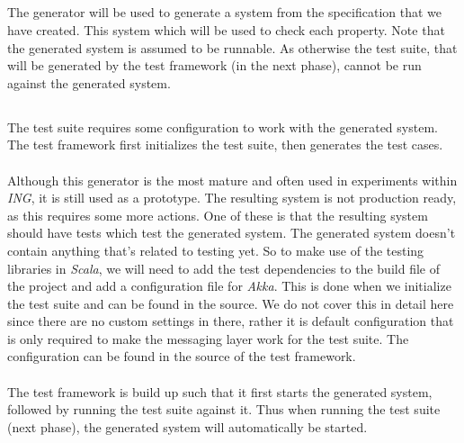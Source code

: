 \subsection{\tfPhaseThree{}}
The generator will be used to generate a system from the specification that we
have created. This system which will be used to check each property. Note that
the generated system is assumed to be runnable. As otherwise the test suite,
that will be generated by the test framework (in the next phase), cannot be run
against the generated system.

\subsection{\tfPhaseFour{}}
\label{sct:3_tf_phase_four}
The test suite requires some configuration to work with the generated system.
The test framework first initializes the test suite, then generates the test
cases.\\
\\
Although this generator is the most mature and often used in experiments within
\textit{ING}, it is still used as a prototype. The resulting system is not
production ready, as this requires some more actions. One of these is that the
resulting system should have tests which test the generated system. The
generated system doesn't contain anything that's related to testing yet. So to
make use of the testing libraries in \textit{Scala}, we will need to add the
test dependencies to the build file of the project and add a configuration file
for \textit{Akka}. This is done when we initialize the test suite and can be
found in the source. We do not cover this in detail here since there are no
custom settings in there, rather it is default configuration that is only
required to make the messaging layer work for the test suite. The configuration
can be found in the source of the test framework.\\
\\
The test framework is build up such that it first starts the generated system,
followed by running the test suite against it. Thus when running the test suite
(next phase), the generated system will automatically be started.\\
\\
